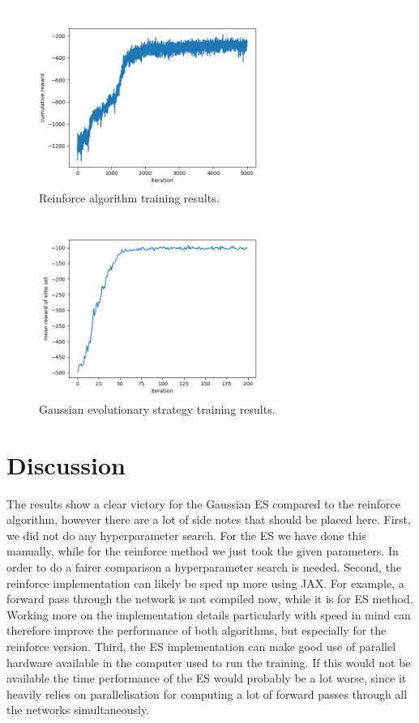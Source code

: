 \documentclass{article}
\begin{document}
\begin{figure}[h]
	\centering
	\includegraphics[width = 0.7\textwidth]{images/reinforce.png}
	\caption{Reinforce algorithm training results.}
	\label{fig: reinforce}
\end{figure}

\begin{figure}[h]
	\centering
	\includegraphics[width = 0.7\textwidth]{images/ES.png}
	\caption{Gaussian evolutionary strategy training results.}
	\label{fig: ES}
\end{figure}

\section{Discussion}
\label{sec: discussion}
The results show a clear victory for the Gaussian ES compared to the reinforce
algorithm, however there are a lot of side notes that should be placed here.
First, we did not do any hyperparameter search. For the ES we have done this
manually, while for the reinforce method we just took the given parameters. In
order to do a fairer comparison a hyperparameter search is needed. Second, the
reinforce implementation can likely be sped up more using JAX. For example, a
forward pass through the network is not compiled now, while it is for ES
method. Working more on the implementation details particularly with speed in
mind can therefore improve the performance of both algorithms, but especially
for the reinforce version. Third, the ES implementation can make good use of
parallel hardware available in the computer used to run the training. If this
would not be available the time performance of the ES would probably be a lot
worse, since it heavily relies on parallelisation for computing a lot of
forward passes through all the networks simultaneously.
\end{document}
